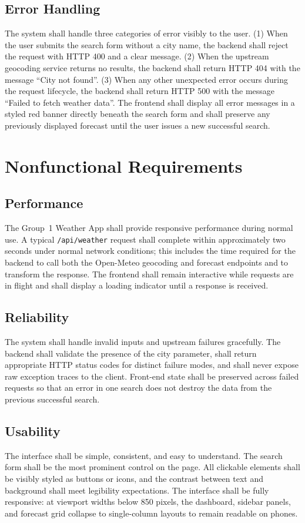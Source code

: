 \documentclass[11pt,letterpaper]{article}
\begin{document}
\subsection{Error Handling}
The system shall handle three categories of error visibly to the user. (1) When the user submits the search form without a city name, the backend shall reject the request with HTTP 400 and a clear message. (2) When the upstream geocoding service returns no results, the backend shall return HTTP 404 with the message ``City not found''. (3) When any other unexpected error occurs during the request lifecycle, the backend shall return HTTP 500 with the message ``Failed to fetch weather data''. The frontend shall display all error messages in a styled red banner directly beneath the search form and shall preserve any previously displayed forecast until the user issues a new successful search.

\section{Nonfunctional Requirements}

\subsection{Performance}
The Group~1 Weather App shall provide responsive performance during normal use. A typical \texttt{/api/weather} request shall complete within approximately two seconds under normal network conditions; this includes the time required for the backend to call both the Open-Meteo geocoding and forecast endpoints and to transform the response. The frontend shall remain interactive while requests are in flight and shall display a loading indicator until a response is received.

\subsection{Reliability}
The system shall handle invalid inputs and upstream failures gracefully. The backend shall validate the presence of the city parameter, shall return appropriate HTTP status codes for distinct failure modes, and shall never expose raw exception traces to the client. Front-end state shall be preserved across failed requests so that an error in one search does not destroy the data from the previous successful search.

\subsection{Usability}
The interface shall be simple, consistent, and easy to understand. The search form shall be the most prominent control on the page. All clickable elements shall be visibly styled as buttons or icons, and the contrast between text and background shall meet legibility expectations. The interface shall be fully responsive: at viewport widths below 850 pixels, the dashboard, sidebar panels, and forecast grid collapse to single-column layouts to remain readable on phones.
\end{document}
